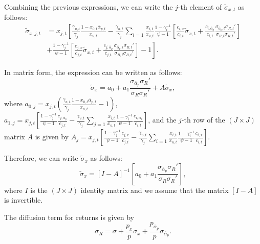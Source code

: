Combining the previous expressions, we can write the $ j $-th element of $\widetilde{\sigma}_{x,t}$ as follows:
\begin{align}
	\widetilde{\sigma}_{x,j,t} &= x_{j,t} \left[ \frac{\gamma_{u,t}}{\gamma_j} \frac{1-x_{0,t} \overline{\alpha}_{p,t}}{x_{u,t}} - \frac{\gamma_{u,t}}{\gamma_j} \sum_{i=1} \frac{x_{i,t}}{x_{u,t}} \frac{1-\gamma_i^{-1}}{\psi-1} \left[\frac{c_{i,x}}{c_{i,t}} \widetilde{\sigma}_{x,t}+\frac{c_{i,\overline{\alpha}_p}}{c_{i,t}} \frac{\sigma_{\overline{\alpha}_p,t} \sigma_{R,t}'}{\sigma_{R,t}\sigma_{R,t}'}\right] \right.\nonumber\\
	&\left.+ \frac{1-\gamma_j^{-1}}{\psi-1} \left[\frac{c_{j,x}}{c_{j,t}} \widetilde{\sigma}_{x,t}+\frac{c_{j,\overline{\alpha}_p}}{c_{j,t}} \frac{\sigma_{\overline{\alpha}_p,t} \sigma_{R,t}'}{\sigma_{R,t}\sigma_{R,t}'}\right]-1\right].
\end{align}

In matrix form, the expression can be written as follows:
\begin{equation}
	\widetilde{\sigma}_{x} = a_{0} + a_1 \frac{\sigma_{\overline{\alpha}_p} \sigma_{R}'}{\sigma_{R}\sigma_{R}'} + A \widetilde{\sigma}_x,
\end{equation}
where $a_{0,j} = x_{j,t} \left( \frac{\gamma_{u,t}}{\gamma_j} \frac{1-x_{0,t} \overline{\alpha}_{p,t}}{x_{u,t}}  - 1\right) $, $a_{1,j} = x_{j,t} \left[ \frac{1-\gamma_j^{-1}}{\psi-1} \frac{c_{j,\overline{\alpha}_p}}{c_{j,t}} -  
\frac{\gamma_{u,t}}{\gamma_j} \sum_{j=1} \frac{x_{i,t}}{x_{u,t}} \frac{1-\gamma_i^{-1}}{\psi-1} \frac{c_{i,\overline{\alpha}_p}}{c_{i,t}}
\right]$, and the $j$-th row of the $ (J\times J )$ matrix $A$ is given by $A_j = x_{j,t} \left[ \frac{1-\gamma_j^{-1}}{\psi-1} \frac{c_{j,x}}{c_{j,t}} - \frac{\gamma_{u,t}}{\gamma_j} \sum_{i=1} \frac{x_{i,t}}{x_{u,t}} \frac{1-\gamma_i^{-1}}{\psi-1} \frac{c_{i,x}}{c_{i,t}} \right] $.

Therefore, we can write $\widetilde{\sigma}_x$ as follows:
\begin{equation}\label{eq:tilde-sigmax}
	\widetilde{\sigma}_{x} = [I-A]^{-1} \left[ a_{0} + a_1 \frac{\sigma_{\overline{\alpha}_p} \sigma_{R}'}{\sigma_{R}\sigma_{R}'} \right],
\end{equation}
where $ I $ is the $ (J\times J) $ identity matrix and we assume that the matrix $\left[I-A\right]$ is invertible.

The diffusion term for returns is given by
\begin{equation}
	\sigma_R = \sigma + \frac{p_x}{p} \sigma_x + \frac{p_{\overline{\alpha}_p}}{p} \sigma_{\overline{\alpha}_p}.
\end{equation}

